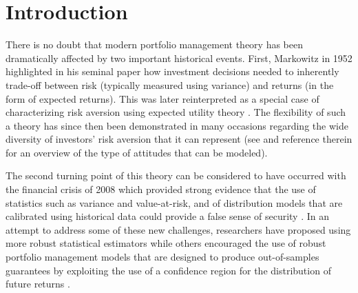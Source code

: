 \section{Introduction}
\label{sec:intro}

There is no doubt that modern portfolio management theory has been dramatically affected
by two important historical events. First, Markowitz in 1952 highlighted in his seminal
paper \cite{markowitz1952portfolio} how investment decisions needed to inherently
trade-off between risk (typically measured using variance) and returns (in the form of
expected returns). This was later reinterpreted as a special case of characterizing risk
aversion using expected utility theory \cite{neumann44:tgeb}.  The flexibility of such a
theory has since then been demonstrated in many occasions regarding the wide diversity of
investors' risk aversion that it can represent (see \cite{ingersoll87} and reference
therein for an overview of the type of attitudes that can be modeled).

The second turning point of this theory can be considered to have occurred with the
financial crisis of 2008 which provided strong evidence that the use of statistics such as
variance and value-at-risk, and of distribution models that are calibrated using historical data could
provide a false sense of security \cite{Salmon09}.  In an attempt to address some of these
new challenges, researchers have proposed using more robust statistical estimators
\cite{madan1998variance,goldfarb03,olivares2015robust} while others encouraged the use of
robust portfolio management models that are designed to produce out-of-samples guarantees
by exploiting the use of a confidence region for the distribution of future returns
\cite{delageYe10,huangzhu10,Esfahani15}.

